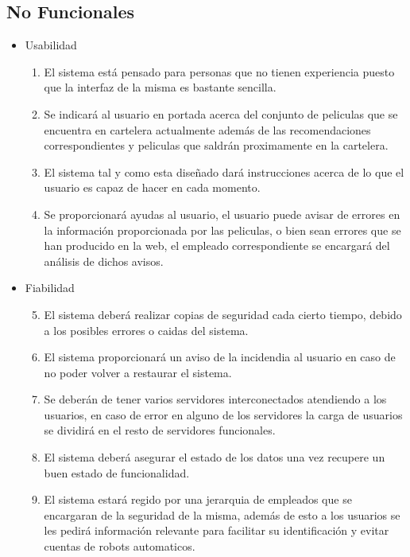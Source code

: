 \documentclass{article}
\begin{document}
    \subsection{No Funcionales}
    \begin{itemize}
    \item Usabilidad
        \begin{enumerate}[label=\bfseries RN- \arabic*:]
        \item El sistema está pensado para personas que no tienen experiencia puesto que la interfaz de la misma es bastante sencilla.
        \item Se indicará al usuario en portada acerca del conjunto de peliculas que se encuentra en cartelera actualmente además de las recomendaciones correspondientes y peliculas que saldrán proximamente en la cartelera.
        \item El sistema tal y como esta diseñado dará instrucciones acerca de lo que el usuario es capaz de hacer en cada momento.
        \item Se proporcionará ayudas al usuario, el usuario puede avisar de errores en la información proporcionada por las peliculas, o bien sean errores que se han producido en la web, el empleado correspondiente se encargará del análisis de dichos avisos. 
        \end{enumerate}
    \item Fiabilidad
        \begin{enumerate}[label=\bfseries RN- \arabic*:]
        \setcounter{enumi}{4}
        \item El sistema deberá realizar copias de seguridad cada cierto tiempo, debido a los posibles errores o caidas del sistema.
        \item El sistema proporcionará un aviso de la incidendia al usuario en caso de no poder volver a restaurar el sistema.
        \item Se deberán de tener varios servidores interconectados atendiendo a los usuarios, en caso de error en alguno de los servidores la carga de usuarios se dividirá en el resto de servidores funcionales.
        \item El sistema deberá asegurar el estado de los datos una vez recupere un buen estado de funcionalidad.
        \item El sistema estará regido por una jerarquia de empleados que se encargaran de la seguridad de la misma, además de esto a los usuarios se les pedirá información relevante para facilitar su identificación y evitar cuentas de robots automaticos. 

\end{enumerate}
\end{itemize}
\end{document}
